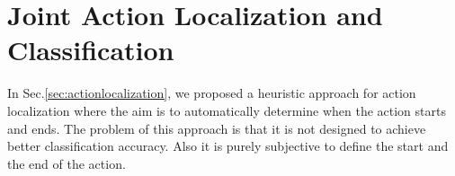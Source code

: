 \documentclass[10pt,twocolumn,letterpaper]{article}
\newcommand{\argmax}{\operatornamewithlimits{argmax}}
\begin{document}
%
%
%



\section{Joint Action Localization and Classification}
In Sec.\ref{sec:actionlocalization}, we proposed a heuristic approach for action localization where the aim is to automatically determine when the action starts and ends. The problem of this approach is that it is not designed to achieve better classification accuracy. Also it is purely subjective to define the start and the end of the action.
\end{document}
